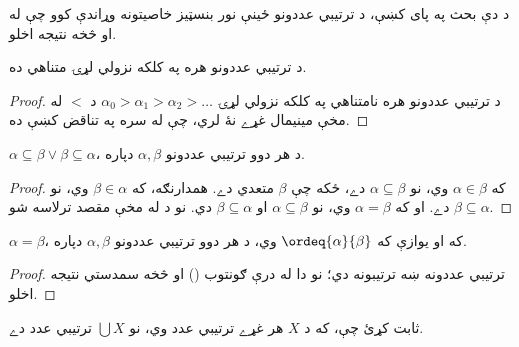 \documentclass[../../../include/open-logic-section]{subfiles}
\begin{document}
د دې بحث په پای کښې، د ترتيبي عددونو ځينې نور بنسټيز خاصيتونه وړاندې
کوو چې له  او
 څخه نتيجه اخلو.

\begin{prop}
د ترتيبي عددونو هره په کلکه نزولي لړۍ متناهي ده.
\end{prop}

\begin{proof}
د ترتيبي عددونو هره نامتناهي په کلکه نزولي لړۍ $\alpha_0 > \alpha_1 > \alpha_2 > \ldots$
د $<$ له مخې مينيمال غړے نۀ لري، چې له  سره
په تناقض کښې ده.
\end{proof}

\begin{prop}
$\alpha \subseteq \beta \lor \beta \subseteq \alpha$، د هر دوو ترتيبي
عددونو $\alpha, \beta$ دپاره.
\end{prop}

\begin{proof}
که $\alpha \in \beta$ وي، نو $\alpha \subseteq \beta$ دے، ځکه چې $\beta$
متعدي دے. همدارنګه، که $\beta \in \alpha$ وي، نو $\beta \subseteq
\alpha$ دے. او که $\alpha = \beta$ وي، نو $\alpha \subseteq \beta$ او
$\beta \subseteq \alpha$ دي. نو د  له مخې مقصد ترلاسه شو.
\end{proof}

\begin{prop}
$\alpha = \beta$، که او يوازې که $\ordeq{\alpha}{\beta}$ وي، د هر دوو
ترتيبي عددونو $\alpha, \beta$ دپاره.
\end{prop}

\begin{proof}
ترتيبي عددونه ښه ترتيبونه دي؛ نو دا له درې ګونتوب
() او
 څخه سمدستي نتيجه اخلو.
\end{proof}

\begin{prob}
ثابت کړئ چې، که د $X$ هر غړے ترتيبي عدد وي، نو $\bigcup X$ ترتيبي عدد دے.
\end{prob}
\end{document}
